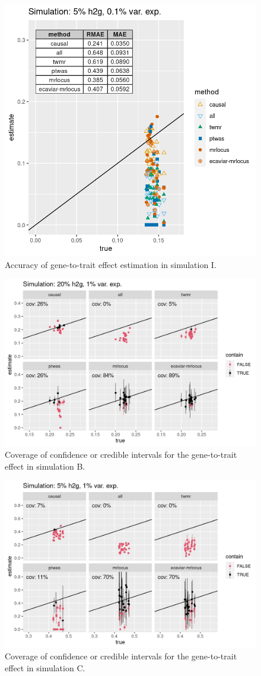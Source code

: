 \documentclass[11pt]{article}
\begin{document}
\begin{figure}[!ht]
  \centering
  \includegraphics[width=.6\textwidth]{figs/sim9.png}
  \caption{Accuracy of gene-to-trait effect estimation in simulation I.}
\end{figure}

\begin{figure}[!ht]
  \centering
  \includegraphics[width=.8\textwidth]{figs/cover3.png}
  \caption{Coverage of confidence or credible intervals for the
    gene-to-trait effect in simulation B.}
\end{figure}

\begin{figure}[!ht]
  \centering
  \includegraphics[width=.8\textwidth]{figs/cover2.png}
  \caption{Coverage of confidence or credible intervals for the
    gene-to-trait effect in simulation C.}
\end{figure}
\end{document}
